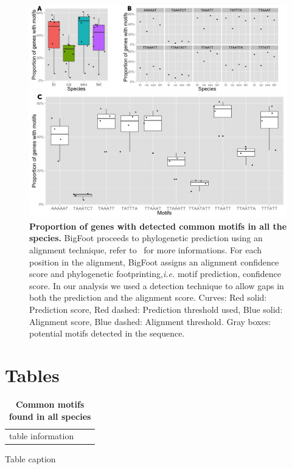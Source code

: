 \documentclass[10pt]{article}
\begin{document}
\begin{figure}[!ht]
\begin{center}
\includegraphics[scale=1]{Figures/PropFigure.pdf}
\end{center}
\caption{
{\bf Proportion of genes with detected common motifs in all the species.} BigFoot proceeds to phylogenetic prediction using an alignment technique, refer to~\citep{satija_bigfoot:_2009} for more informations. For each position in the alignment, BigFoot assigns an alignment confidence score and phylogenetic footprinting,\textit{i.e.} motif prediction, confidence score. In our analysis we used a detection technique to allow gaps in both the prediction and the alignment score. Curves: Red solid: Prediction score, Red dashed: Prediction threshold used, Blue solid: Alignment score, Blue dashed: Alignment threshold. Gray boxes: potential motifs detected in the sequence.
}
\label{fig:PropFigure}
\end{figure}

\section*{Tables}
\begin{table}[!ht]
\caption{
\bf{Common motifs found in all species}}
\begin{tabular}{|c|c|c|}
table information
\end{tabular}
\begin{flushleft}Table caption
\end{flushleft}
\label{tab:label}
\end{table}

\clearpage

\end{document}

